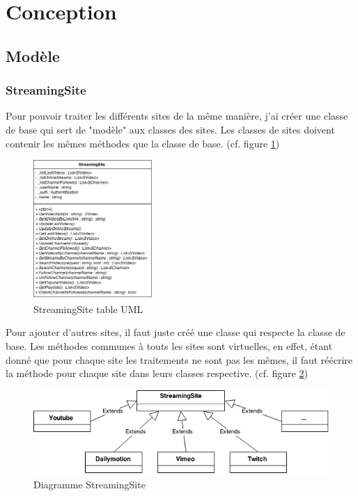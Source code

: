 \documentclass[11pt]{report} %
\begin{document}
	\newpage
	\section{Conception}
		\subsection{Modèle}
			\subsubsection{StreamingSite}
			Pour pouvoir traiter les différents sites de la même manière, j'ai créer une classe de base qui sert de "modèle" aux classes des sites.
			Les classes de sites doivent contenir les mêmes méthodes que la classe de base. (cf. figure \ref{streaming site uml})
			
			\begin{figure}[h]
				\center
				\includegraphics[width=0.4\textwidth]{../img/streamingsiteuml.png}
				\caption{StreamingSite table UML}
				\label{streaming site uml}
			\end{figure}
			
			Pour ajouter d'autres sites, il faut juste créé une classe qui respecte la classe de base.
			Les méthodes communes à touts les sites sont virtuelles, en effet, étant donné que pour chaque site les traitements ne sont pas les mêmes, il faut réécrire la méthode pour chaque site dans leurs classes respective. (cf. figure \ref{streaming site})
			
			\begin{figure}[h]
				\center
				\includegraphics[width=1\textwidth]{../img/StreamingSite.png}
				\caption{Diagramme StreamingSite}
				\label{streaming site}
			\end{figure}
			
\end{document}
